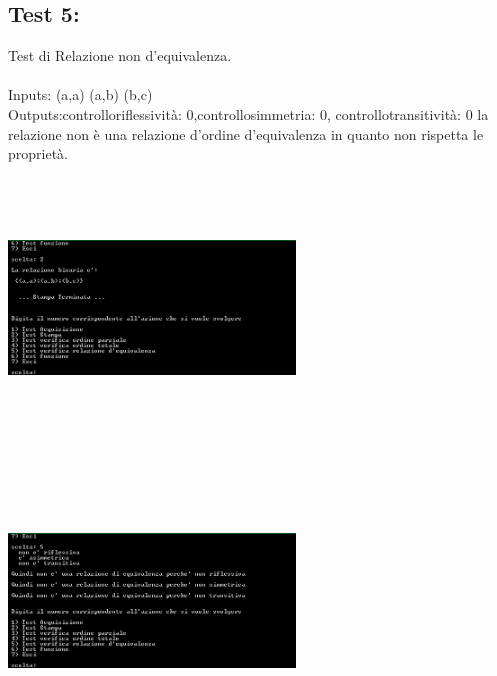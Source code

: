 \documentclass[11pt, a4paper, titlepage, block]{article}
\begin{document}
	\subsection{Test 5:}
	Test di Relazione non d'equivalenza.\\
	\\
	Inputs: (a,a)  (a,b)  (b,c) \\
	Outputs:controlloriflessivit\`a:  0,controllosimmetria:  0, controllotransitivit\`a:  0
	la relazione non \`e una relazione d'ordine d'equivalenza in quanto non rispetta le propriet\`a.\\
	\includegraphics[width=3in,height=3in,viewport=0 0 300 300]{../Screenshots/Test5Input.png}
	\\
	\includegraphics[width=3in,height=3in,viewport=0 0 300 300]{../Screenshots/Test5Output.png}
	\\
	\\
	\newpage
\end{document}
